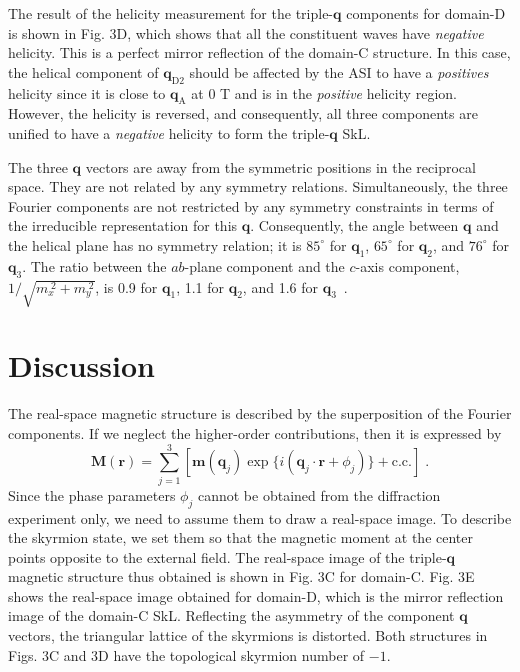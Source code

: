 \documentclass[aps,prb,reprint,superscriptaddress,amsmath,amssymb]{revtex4-2}
\begin{document}
The result of the helicity measurement for the triple-$\bm{q}$ components for domain-D is shown in Fig. 3D, which shows that all the constituent waves have \textit{negative} helicity. This is a perfect mirror reflection of the domain-C structure. 
In this case, the helical component of $\bm{q}_{\text{D2}}$ should be affected by the ASI to have a \textit{positives} helicity since it is close to $\bm{q}_{\text{A}}$ at 0 T and is in the \textit{positive} helicity region. However, the helicity is reversed, and consequently, all three components are unified to have a \textit{negative} helicity to form the triple-$\bm{q}$ SkL. 

The three $\bm{q}$ vectors are away from the symmetric positions in the reciprocal space. They are not related by any symmetry relations. 
Simultaneously, the three Fourier components are not restricted by any symmetry constraints in terms of the irreducible representation for this $\bm{q}$. 
Consequently, the angle between $\bm{q}$ and the helical plane has no symmetry relation; it is $85^{\circ}$ for $\bm{q}_1$, $65^{\circ}$ for $\bm{q}_2$, and $76^{\circ}$ for $\bm{q}_3$. 
The ratio between the $ab$-plane component and the $c$-axis component, $1/\sqrt{m_x^{\;2} + m_y^{\;2}}$, is 0.9 for $\bm{q}_1$, 1.1 for $\bm{q}_2$, and 1.6 for $\bm{q}_3$~\cite{SM}. 

\section{Discussion}
The real-space magnetic structure is described by the superposition of the Fourier components. 
If we neglect the higher-order contributions, then it is expressed by 
\begin{equation}
\bm{M}(\bm{r}) = \sum_{j=1}^{3} [ \bm{m}(\bm{q}_j) \exp \{i(\bm{q}_j\cdot \bm{r} + \phi_j)\} + \text{c.c.} ] \;.
\label{eq:2}
\end{equation}
Since the phase parameters $\phi_j$ cannot be obtained from the diffraction experiment only, we need to assume them to draw a real-space image. 
To describe the skyrmion state, we set them so that the magnetic moment at the center points opposite to the external field. 
The real-space image of the triple-$\bm{q}$ magnetic structure thus obtained is shown in Fig. 3C for domain-C. 
Fig. 3E shows the real-space image obtained for domain-D, which is the mirror reflection image of the domain-C SkL. 
Reflecting the asymmetry of the component $\bm{q}$ vectors, the triangular lattice of the skyrmions is distorted. 
Both structures in Figs. 3C and 3D have the topological skyrmion number of $-1$.  
\end{document}
